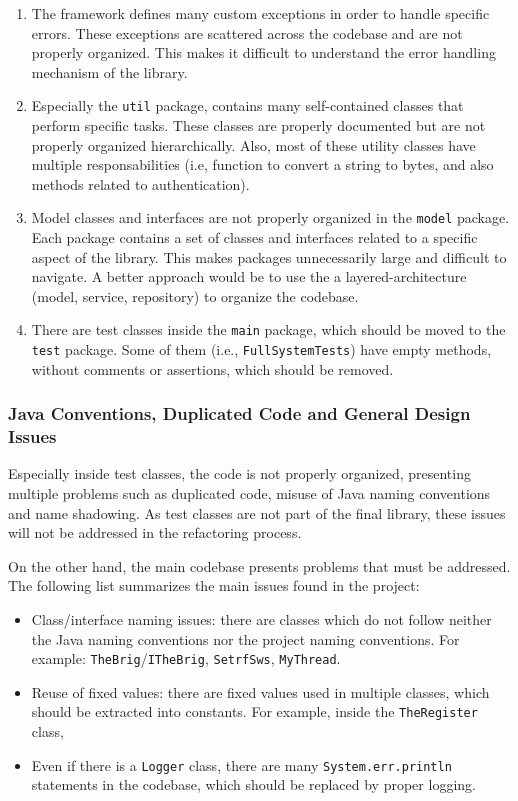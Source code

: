 \begin{enumerate}
	\item The framework defines many custom exceptions in order to handle specific errors. These exceptions are scattered across the codebase and are not properly organized. This makes it difficult to understand the error handling mechanism of the library.
	\item Especially the \texttt{util} package, contains many self-contained classes that perform specific tasks. These classes are properly documented but are not properly organized hierarchically. Also, most of these utility classes have multiple responsabilities (i.e, function to convert a string to bytes, and also methods related to authentication).
	\item Model classes and interfaces are not properly organized in the \texttt{model} package. Each package contains a set of classes and interfaces related to a specific aspect of the library. This makes packages unnecessarily large and difficult to navigate. A better approach would be to use the a layered-architecture (model, service, repository) to organize the codebase.
	\item There are test classes inside the \texttt{main} package, which should be moved to the \texttt{test} package. Some of them (i.e., \texttt{FullSystemTests}) have empty methods, without comments or assertions, which should be removed.
\end{enumerate}

\subsubsection{Java Conventions, Duplicated Code and General Design Issues}

Especially inside test classes, the code is not properly organized, presenting multiple problems such as duplicated code, misuse of Java naming conventions and name shadowing. As test classes are not part of the final library, these issues will not be addressed in the refactoring process.

On the other hand, the main codebase presents problems that must be addressed. The following list summarizes the main issues found in the project:

\begin{itemize}
	\item Class/interface naming issues: there are classes which do not follow neither the Java naming conventions nor the project naming conventions. For example: \texttt{TheBrig}/\texttt{ITheBrig}, \texttt{SetrfSws}, \texttt{MyThread}.
	\item Reuse of fixed values: there are fixed values used in multiple classes, which should be extracted into constants. For example, inside the \texttt{TheRegister} class,
	\item Even if there is a \texttt{Logger} class, there are many \texttt{System.err.println} statements in the codebase, which should be replaced by proper logging.
\end{itemize}



